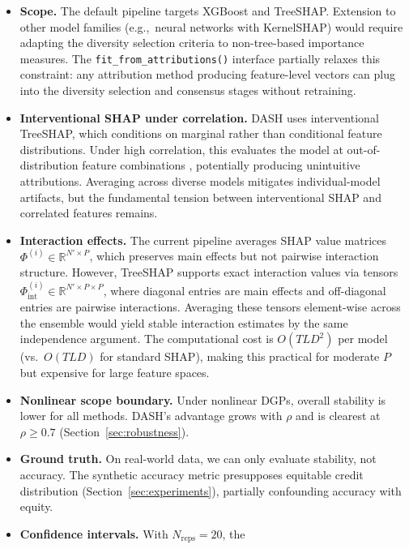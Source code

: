 \documentclass[11pt]{article}
\newcommand{\dash}{\textsc{DASH}}
\newcommand{\rhovar}{\rho}
\newcommand{\eg}{e.g.,\ }
\begin{document}
\begin{itemize}
  \item \textbf{Scope.} The default pipeline targets XGBoost and
    TreeSHAP. Extension to other model families (\eg neural networks
    with KernelSHAP) would require adapting the diversity selection
    criteria to non-tree-based importance measures. The
    \texttt{fit\_from\_attributions()} interface partially relaxes this
    constraint: any attribution method producing feature-level vectors
    can plug into the diversity selection and consensus stages without
    retraining.
  \item \textbf{Interventional SHAP under correlation.} DASH uses
    interventional TreeSHAP, which conditions on marginal rather than
    conditional feature distributions. Under high correlation, this
    evaluates the model at out-of-distribution feature combinations
    \citep{janzing2020feature, aas2021explaining}, potentially
    producing unintuitive attributions. Averaging across diverse models
    mitigates individual-model artifacts, but the fundamental tension
    between interventional SHAP and correlated features remains.
  \item \textbf{Interaction effects.} The current pipeline averages SHAP
    value matrices $\Phi^{(i)} \in \mathbb{R}^{N' \times P}$, which
    preserves main effects but not pairwise interaction structure.
    However, TreeSHAP supports exact interaction values via tensors
    $\Phi_{\text{int}}^{(i)} \in \mathbb{R}^{N' \times P \times P}$,
    where diagonal entries are main effects and off-diagonal entries
    are pairwise interactions. Averaging these tensors element-wise
    across the ensemble would yield stable interaction estimates
    by the same independence argument. The computational cost is
    $O(TLD^2)$ per model (vs.\ $O(TLD)$ for standard SHAP), making
    this practical for moderate $P$ but expensive for large feature
    spaces.
  \item \textbf{Nonlinear scope boundary.} Under nonlinear DGPs,
    overall stability is lower for all methods. \dash{}'s advantage
    grows with $\rhovar$ and is clearest at $\rhovar \geq 0.7$
    (Section~\ref{sec:robustness}).
  \item \textbf{Ground truth.} On real-world data, we can only evaluate
    stability, not accuracy. The synthetic accuracy metric presupposes
    equitable credit distribution (Section~\ref{sec:experiments}),
    partially confounding accuracy with equity.
  \item \textbf{Confidence intervals.} With $N_{\text{reps}} = 20$, the

\end{itemize}
\end{document}
